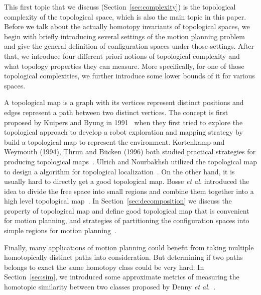 This first topic that we discuss (Section~\ref{sec:complexity}) is the topological complexity of the topological space, which is also the main topic in this paper. Before we talk about the actually homotopy invariants of topological spaces, we begin with briefly introducing several settings of the motion planning problem and give the general definition of configuration spaces under those settings. After that, we introduce four different priori notions of topological complexity and what topology properties they can measure. More specifically, for one of those topological complexities, we further introduce some lower bounds of it for various spaces.

A topological map is a graph with its vertices represent distinct positions and edges represent a path between two distinct vertices. The concept is first proposed by Kuipers and Byung in 1991~\cite{kuipers1991robot} when they first tried to explore the topological approach to develop a robot exploration and mapping strategy by build a topological map to represent the environment. Kortenkamp and Weymouth (1994), Thrun and B\"ucken (1996) both studied practical strategies for producing topological maps~\cite{kortenkamp1994topological,thrun1996learning}. Ulrich and Nourbakhsh utilized the topological map to design a algorithm for topological localization~\cite{ulrich2000appearance}. On the other hand, it is usually hard to directly get a good topological map. Bosse \emph{et al.} introduced the idea to divide the free space into small regions and combine them together into a high level topological map~\cite{bosse2003atlas}.
In Section~\ref{sec:decomposition} we discuss the property of topological map and define good topological map that is convenient for motion planning, and strategies of partitioning the configuration spaces into simple regions for motion planning~\cite{DBLP:conf/isrr/ChosetR03}.

Finally, many applications of motion planning could benefit from taking multiple homotopically distinct paths into consideration. But determining if two paths belongs to exact the same homotopy class could be very hard. In Section~\ref{sec:sim}, we introduced some approximate metrics of measuring the homotopic similarity between two classes proposed by Denny \emph{et al.}~\cite{denny2018topology}.